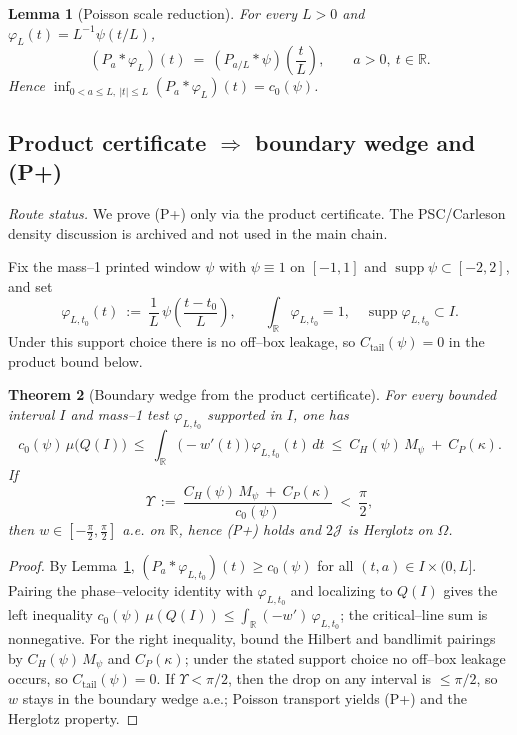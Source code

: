 \documentclass[11pt]{article}
\newtheorem{theorem}{Theorem}
\newtheorem{lemma}[theorem]{Lemma}
\theoremstyle{definition}
\theoremstyle{remark}
\newcommand{\R}{\mathbb{R}}
\newcommand{\Poisson}{P}
\begin{document}
\begin{lemma}[Poisson scale reduction]\label{lem:poisson-scale-stage2}
For every $L>0$ and $\varphi_L(t)=L^{-1}\psi(t/L)$,
\[
 (\Poisson_a*\varphi_L)(t)\ =\ (\Poisson_{a/L}*\psi)\!\left(\frac{t}{L}\right),\qquad a>0,\ t\in\R.
\]
Hence $\inf_{0<a\le L,\ |t|\le L}(\Poisson_a*\varphi_L)(t)=c_0(\psi)$.
\end{lemma}

\subsection*{Product certificate $\Rightarrow$ boundary wedge and (P+)}
\noindent\textit{Route status.} We prove (P+) only via the product certificate. The PSC/Carleson density discussion is archived and not used in the main chain.

Fix the mass--1 printed window $\psi$ with $\psi\equiv 1$ on $[-1,1]$ and $\operatorname{supp}\psi\subset[-2,2]$, and set
\[
  \varphi_{L,t_0}(t)\ :=\ \frac{1}{L}\,\psi\!\left(\frac{t-t_0}{L}\right),\qquad \int_{\R}\!\varphi_{L,t_0}=1,\quad \operatorname{supp}\varphi_{L,t_0}\subset I.
\]
Under this support choice there is no off--box leakage, so $C_{\mathrm{tail}}(\psi)=0$ in the product bound below.

\begin{theorem}[Boundary wedge from the product certificate]\label{thm:psc-certificate-stage2}
For every bounded interval $I$ and mass--1 test $\varphi_{L,t_0}$ supported in $I$, one has
\[
  c_0(\psi)\,\mu\!\big(Q(I)\big)
  \ \le\ \int_{\R} \big(-w'(t)\big)\,\varphi_{L,t_0}(t)\,dt
  \ \le\ C_H(\psi)\,M_\psi\ +\ C_P(\kappa).\]
If
\[
  \Upsilon\ :=\ \frac{C_H(\psi)\,M_\psi\ +\ C_P(\kappa)}{c_0(\psi)}\ <\ \frac{\pi}{2},
\]
then $w\in[-\tfrac{\pi}{2},\tfrac{\pi}{2}]$ a.e. on $\R$, hence \emph{(P+)} holds and $2\mathcal J$ is Herglotz on $\Omega$.
\end{theorem}

\begin{proof}
By Lemma~\ref{lem:poisson-scale-stage2}, $(\Poisson_a*\varphi_{L,t_0})(t)\ge c_0(\psi)$ for all $(t,a)\in I\times(0,L]$. Pairing the phase--velocity identity with $\varphi_{L,t_0}$ and localizing to $Q(I)$ gives the left inequality $c_0(\psi)\,\mu(Q(I))\le \int_{\R}(-w')\,\varphi_{L,t_0}$; the critical--line sum is nonnegative. For the right inequality, bound the Hilbert and bandlimit pairings by $C_H(\psi)\,M_\psi$ and $C_P(\kappa)$; under the stated support choice no off--box leakage occurs, so $C_{\mathrm{tail}}(\psi)=0$.
If $\Upsilon<\pi/2$, then the drop on any interval is $\le \pi/2$, so $w$ stays in the boundary wedge a.e.; Poisson transport yields (P+) and the Herglotz property.
\end{proof}
\end{document}
